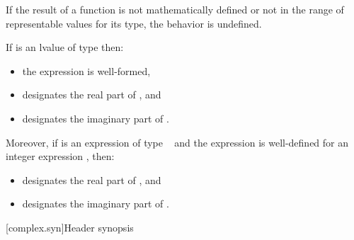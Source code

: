 \pnum
If the result of a function is not mathematically defined or not in
the range of representable values for its type, the behavior is
undefined.

\pnum
If  is an lvalue of type \cv{}  then:
\begin{itemize}
\item the expression  is well-formed,
\item {} designates the real part of , and
\item {} designates the imaginary part of .
\end{itemize}

Moreover, if  is an expression of type \cv{}~ and the expression  is well-defined for an integer expression , then:
\begin{itemize}
\item {} designates the real part of , and
\item {} designates the imaginary part of .
\end{itemize}

[complex.syn]{Header  synopsis}


